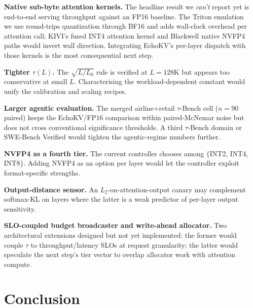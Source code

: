 \documentclass{article}
\begin{document}
\textbf{Native sub-byte attention kernels.} The headline result we
\emph{can't} report yet is end-to-end serving throughput against an
FP16 baseline. The Triton emulation we use round-trips quantization
through BF16 and adds wall-clock overhead per attention call; KIVI's
fused INT4 attention kernel and Blackwell native NVFP4 paths would
invert wall direction. Integrating EchoKV's per-layer dispatch with
those kernels is the most consequential next step.

\textbf{Tighter $\tau(L)$.} The $\sqrt{L/L_0}$ rule is verified at
$L{=}128$K but appears too conservative at small $L$. Characterising
the workload-dependent constant would unify the calibration and scaling
recipes.

\textbf{Larger agentic evaluation.} The merged airline+retail
$\tau$-Bench cell ($n{=}90$ paired) keeps the EchoKV/FP16 comparison within
paired-McNemar noise but does not cross conventional significance
thresholds. A third $\tau$-Bench domain or SWE-Bench Verified would
tighten the agentic-regime numbers further.

\textbf{NVFP4 as a fourth tier.} The current controller chooses among
$\{$INT2, INT4, INT8$\}$. Adding NVFP4 as an option per layer would let
the controller exploit format-specific strengths.

\textbf{Output-distance sensor.} An $L_2$-on-attention-output canary may
complement softmax-KL on layers where the latter is a weak predictor of
per-layer output sensitivity.

\textbf{SLO-coupled budget broadcaster and write-ahead allocator.} Two
architectural extensions designed but not yet implemented: the former
would couple $\tau$ to throughput/latency SLOs at request granularity;
the latter would speculate the next step's tier vector to overlap
allocator work with attention compute.

\section{Conclusion}
\label{sec:conclusion}
\end{document}
